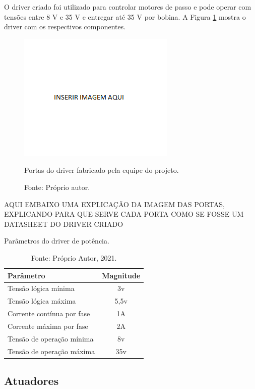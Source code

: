 O driver criado foi utilizado para controlar motores de passo e pode operar com tensões entre 8 V e 35 V e 
entregar até 35 V por bobina. A Figura \ref{fig:driverportas} mostra o driver com os respectivos componentes.

\begin{figure}[!htb]
\centering
\includegraphics[scale = 0.2]{figuras/3-14}
\caption{Portas do driver fabricado pela equipe do projeto.}
\caption*{Fonte: Próprio autor.}
\label{fig:driverportas}
\end{figure}
    
AQUI EMBAIXO UMA EXPLICAÇÃO DA IMAGEM DAS PORTAS, EXPLICANDO PARA QUE SERVE CADA PORTA COMO SE 
FOSSE UM DATASHEET DO DRIVER CRIADO

\begin{table}
    \centering
    \caption{Parâmetros do driver de potência.}
    \begin{tabular}{lc}
        \hline
        \textbf{Parâmetro} & \textbf{Magnitude}\\
        \hline
        Tensão lógica mínima & 3v\\
        Tensão lógica máxima & 5,5v\\
        Corrente contínua por fase & 1A\\
        Corrente máxima por fase & 2A\\
        Tensão de operação mínima & 8v\\
        Tensão de operação máxima & 35v\\ 
        \hline       
    \end{tabular}
    \caption*{Fonte: Próprio Autor, 2021.}
    \label{tab:pdriver}
\end{table}

\subsection{Atuadores}\label{subsec:metatuadores}


